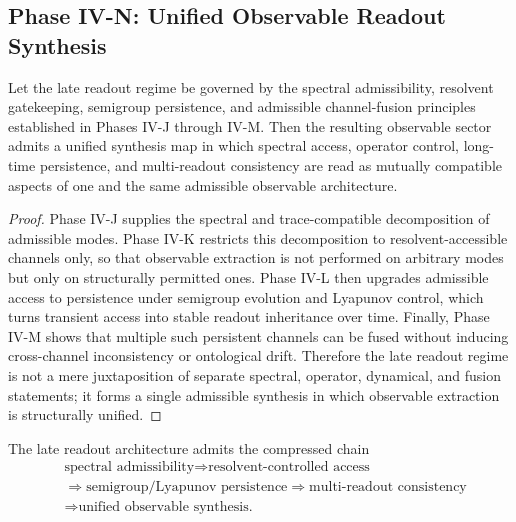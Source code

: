 \subsection*{Phase IV-N: Unified Observable Readout Synthesis}

\begin{proposition}
\label{prop:unified-observable-readout}
Let the late readout regime be governed by the spectral admissibility, resolvent gatekeeping, semigroup persistence, and admissible channel-fusion principles established in Phases IV-J through IV-M. Then the resulting observable sector admits a unified synthesis map in which spectral access, operator control, long-time persistence, and multi-readout consistency are read as mutually compatible aspects of one and the same admissible observable architecture.
\end{proposition}

\begin{proof}
Phase IV-J supplies the spectral and trace-compatible decomposition of admissible modes. Phase IV-K restricts this decomposition to resolvent-accessible channels only, so that observable extraction is not performed on arbitrary modes but only on structurally permitted ones. Phase IV-L then upgrades admissible access to persistence under semigroup evolution and Lyapunov control, which turns transient access into stable readout inheritance over time. Finally, Phase IV-M shows that multiple such persistent channels can be fused without inducing cross-channel inconsistency or ontological drift. Therefore the late readout regime is not a mere juxtaposition of separate spectral, operator, dynamical, and fusion statements; it forms a single admissible synthesis in which observable extraction is structurally unified.\qedhere
\end{proof}

\begin{corollary}
The late readout architecture admits the compressed chain
\[
\begin{aligned}
&\text{spectral admissibility}
\Longrightarrow \text{resolvent-controlled access}\\
&\Longrightarrow \text{semigroup/Lyapunov persistence}
\Longrightarrow \text{multi-readout consistency}\\
&\Longrightarrow \text{unified observable synthesis.}
\end{aligned}
\]
\end{corollary}

